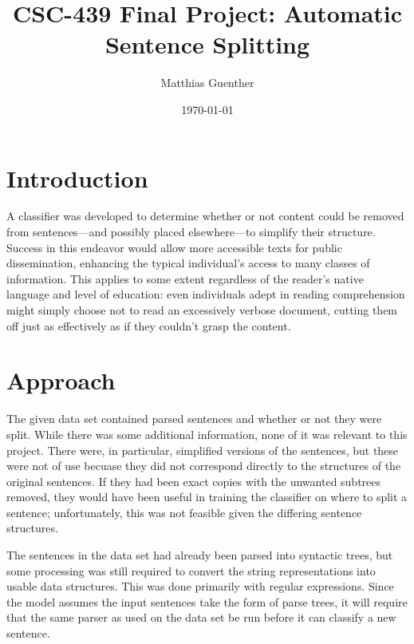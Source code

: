 \documentclass{article}
\begin{document}
\title{CSC-439 Final Project: Automatic Sentence Splitting}
\date{\today}
\author{Matthias Guenther}
\maketitle



\section*{Introduction}

A classifier was developed to determine whether or not content could be removed from sentences---and possibly placed elsewhere---to simplify their structure. Success in this endeavor would allow more accessible texts for public dissemination, enhancing the typical individual's access to many classes of information. This applies to some extent regardless of the reader's native language and level of education: even individuals adept in reading comprehension might simply choose not to read an excessively verbose document, cutting them off just as effectively as if they couldn't grasp the content.



\section*{Approach}

The given data set contained parsed sentences and whether or not they were split. While there was some additional information, none of it was relevant to this project. There were, in particular, simplified versions of the sentences, but these were not of use becuase they did not correspond directly to the structures of the original sentences. If they had been exact copies with the unwanted subtrees removed, they would have been useful in training the classifier on where to split a sentence; unfortunately, this was not feasible given the differing sentence structures.

The sentences in the data set had already been parsed into syntactic trees, but some processing was still required to convert the string representations into usable data structures. This was done primarily with regular expressions. Since the model assumes the input sentences take the form of parse trees, it will require that the same parser as used on the data set be run before it can classify a new sentence.
\end{document}
